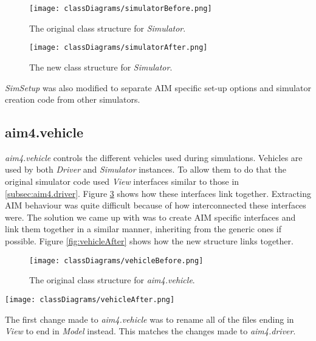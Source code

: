 \begin{appendices}
\begin{figure}[htb]
\centering
\texttt{[image: classDiagrams/simulatorBefore.png]}
\caption{The original class structure for \emph{Simulator}.}
\label{fig:simulatorBefore}
\end{figure}

\begin{figure}[htb]
\centering
\texttt{[image: classDiagrams/simulatorAfter.png]}
\caption{The new class structure for \emph{Simulator}.}
\label{fig:simulatorAfter}
\end{figure}

\emph{SimSetup} was also modified to separate AIM specific set-up options and simulator creation code from other simulators.

\FloatBarrier
\subsection{aim4.vehicle}
\label{subsec:aim4.vehicle}
\emph{aim4.vehicle} controls the different vehicles used during simulations. Vehicles are used by both \emph{Driver} and \emph{Simulator} instances. To allow them to do that the original simulator code used \emph{View} interfaces similar to those in \ref{subsec:aim4.driver}. Figure \ref{fig:vehicleBefore} shows how these interfaces link together. Extracting AIM behaviour was quite difficult because of how interconnected these interfaces were. The solution we came up with was to create AIM specific interfaces and link them together in a similar manner, inheriting from the generic ones if possible. Figure \ref{fig:vehicleAfter} shows how the new structure links together.

\begin{figure}[htb]
\centering
\texttt{[image: classDiagrams/vehicleBefore.png]}
\caption{The original class structure for \emph{aim4.vehicle}.}
\label{fig:vehicleBefore}
\end{figure}

\begin{sidewaysfigure}[p]
\texttt{[image: classDiagrams/vehicleAfter.png]}
\caption{The new class structure for \emph{aim4.vehicle}.}
\label{fig:vehicleAfter}
\end{sidewaysfigure}

The first change made to \emph{aim4.vehicle} was to rename all of the files ending in \emph{View} to end in \emph{Model} instead. This matches the changes made to \emph{aim4.driver}.


\end{appendices}
